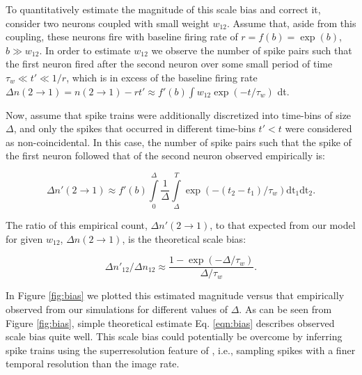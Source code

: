 To quantitatively estimate the magnitude of this scale bias and correct it, consider two neurons coupled with small weight $w_{12}$. Assume that, aside from this coupling, these neurons fire with baseline firing rate of $r=f(b)=\exp(b)$, $b \gg w_{12}$. In order to estimate $w_{12}$ we observe the number of spike pairs such that the first neuron fired after the second neuron over some small period of time $\tau_w \ll t' \ll 1/r$, which is in excess of the baseline firing rate $\Delta n(2\rightarrow 1) = n(2\rightarrow 1) - r t' \approx f'(b) \int  w_{12} \exp(-t/\tau_w)$ dt.

Now, assume that spike trains were additionally discretized into time-bins of size $\Delta$, and only the spikes that occurred in different time-bins $t'<t$ were considered as non-coincidental. In this case, the number of spike pairs such that the spike of the first neuron followed that of the second neuron observed empirically is: 

\begin{equation}
\Delta n'(2\rightarrow 1) \approx f'(b) \int\limits_0^\Delta \frac{1}{\Delta} \int\limits_{\Delta}^T \exp(-(t_2-t_1)/\tau_w) \text{dt}_1 \text{dt}_2.
\end{equation} 

The ratio of this empirical count, $\Delta n'(2\rightarrow 1)$, to that expected from our model for given $w_{12}$, $\Delta n(2\rightarrow 1)$, is the theoretical scale bias:

\begin{equation}\label{eqn:bias}
\Delta n'_{12}/\Delta n_{12}\approx \frac{1-\exp(-\Delta/\tau_w)}{\Delta/\tau_w}.
\end{equation}

In Figure \ref{fig:bias} we plotted this estimated magnitude versus that empirically observed from our simulations for different values of $\Delta$. As can be seen from Figure \ref{fig:bias}, simple theoretical estimate Eq. \ref{eqn:bias} describes observed scale bias quite well.  This scale bias could potentially be overcome by inferring spike trains using the superresolution feature of \cite{VogPan09}, i.e., sampling spikes with a finer temporal resolution than the image rate.

